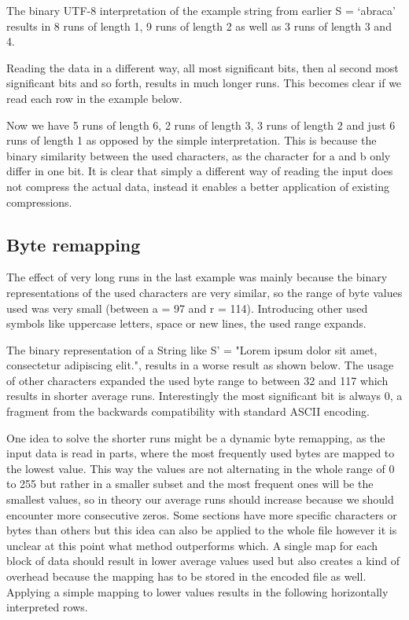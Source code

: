 \par{
The binary UTF-8 interpretation of the example string from earlier S = ‘abraca’ results in 8 runs of length 1, 9 runs of length 2 as well as 3 runs of length 3 and 4.  
\scalardump\dataA

Reading the data in a different way, all most significant bits, then al second most significant bits and so forth, results in much longer runs. This becomes clear if we read each row in the example below. 
\arraydump\dataA

Now we have 5 runs of length 6, 2 runs of length 3, 3 runs of length 2 and just 6 runs of length 1 as opposed by the simple interpretation. This is because the binary similarity between the used characters, as the character for a and b only differ in one bit. It is clear that simply a different way of reading the input does not compress the actual data, instead it enables a better application of existing compressions. 
}

\subsection{Byte remapping}
\label{ch:Analysis:sec:Improvements by Preprocessing:subSec:byteRemapping}
\par{
The effect of very long runs in the last example was mainly because the binary representations of the used characters are very similar, so the range of byte values used was very small (between a = 97 and r = 114). Introducing other used symbols like uppercase letters, space or new lines, the used range expands.
}

\par{
The binary representation of a String like S' = "Lorem ipsum dolor sit amet, consectetur adipiscing elit.", results in a worse result as shown below. 
The usage of other characters expanded the used byte range to between 32 and 117 which results in shorter average runs. Interestingly the most significant bit is always 0, a fragment from the backwards compatibility with standard ASCII encoding.

\arraydump\dataB
}

\par{
One idea to solve the shorter runs might be a dynamic byte remapping, as the input data is read in parts, where the most frequently used bytes are mapped to the lowest value. This way the values are not alternating in the whole range of 0 to 255 but rather in a smaller subset and the most frequent ones will be the smallest values, so in theory our average runs should increase because we should encounter more consecutive zeros. Some sections have more specific characters or bytes than others but this idea can also be applied to the whole file however it is unclear at this point what method outperforms which. A single map for each block of data should result in lower average values used but also creates a kind of overhead because the mapping has to be stored in the encoded file as well. Applying a simple mapping to lower values results in the following horizontally interpreted rows.
}

